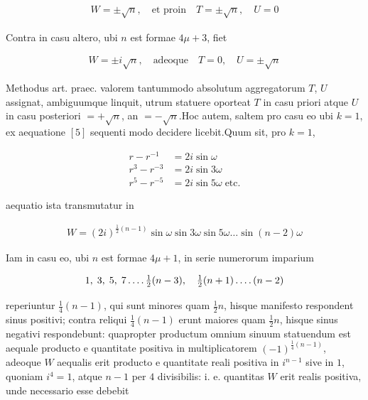 \[
\begin{aligned}
W=\pm\surd n,\quad\text{et proin}\quad T=\pm\surd n,\quad U=0
\end{aligned}
\]

Contra in casu altero, ubi $n$ est formae $4\mu+3$, fiet

\[
\begin{aligned}
W=\pm i\surd n,\quad\text{adeoque}\quad T=0,\quad U=\pm\surd n
\end{aligned}
\]


Methodus art. praec. valorem tantummodo absolutum aggregatorum $T$, $U$ assignat, ambiguumque linquit, utrum statuere oporteat $T$ in casu priori atque $U$ in casu posteriori $=+\surd n$, an $=-\surd n$.\quad Hoc autem, saltem pro casu eo ubi $k=1$, ex aequatione $[5]$ sequenti modo decidere licebit.\quad Quum sit, pro $k=1$,

%
\[
\begin{aligned}
r-r^{-1}&=2i\sin\omega\\
r^3-r^{-3}&=2i\sin3\omega\\
r^5-r^{-5}&=2i\sin5\omega\;\text{etc.}
\end{aligned}
\]

aequatio ista transmutatur in

\[
\begin{aligned}
W=(2i)^{\frac12(n-1)}\sin\omega\sin3\omega\sin5\omega\ldots\sin(n-2)\omega
\end{aligned}
\]

Iam in casu eo, ubi $n$ est formae $4\mu+1$, in serie numerorum imparium

\[
\begin{aligned}
1,\;3,\;5,\;7\mathinner{.\,.\,.\,.}\tfrac12(n-3),\quad\tfrac12(n+1)\mathinner{.\,.\,.\,.}(n-2)
\end{aligned}
\]

reperiuntur $\frac14(n-1)$, qui sunt minores quam $\frac12n$, hisque manifesto respondent sinus positivi; contra reliqui $\frac14(n-1)$ erunt maiores quam $\frac12n$, hisque sinus negativi respondebunt: quapropter productum omnium sinuum statuendum est aequale producto e quantitate positiva in multiplicatorem $(-1)^{\frac14(n-1)}$, adeoque $W$ aequalis erit producto e quantitate reali positiva in $i^{n-1}$ sive in $1$, quoniam $i^4=1$, atque $n-1$ per $4$ divisibilis: i. e. quantitas $W$ erit realis positiva, unde necessario esse debebit

